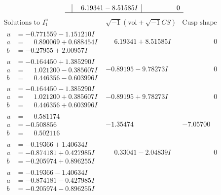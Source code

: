 \documentclass[1p]{elsarticle_modified}
\theoremstyle{definition}
\newcommand{\I}{\sqrt{-1}}
\begin{document}
$$\begin{array}{c|c|c}
 & \phantom{-}6.19341 - 8.51585 I & \phantom{-0.000000 } 0\\
 \hline 
 \end{array}$$\newpage$$\begin{array}{c|c|c}  
\text{Solutions to }I^u_{1}& \I (\text{vol} + \sqrt{-1}CS) & \text{Cusp shape}\\
 \hline 
\begin{aligned}
u &= -0.771559 - 1.151210 I \\
a &= \phantom{-}0.890069 + 0.688454 I \\
b &= -0.27955 + 2.00957 I\end{aligned}
 & \phantom{-}6.19341 + 8.51585 I & \phantom{-0.000000 } 0 \\ \hline\begin{aligned}
u &= -0.164450 + 1.385290 I \\
a &= \phantom{-}1.021200 - 0.385607 I \\
b &= \phantom{-}0.446356 - 0.603996 I\end{aligned}
 & -0.89195 - 9.78273 I & \phantom{-0.000000 } 0 \\ \hline\begin{aligned}
u &= -0.164450 - 1.385290 I \\
a &= \phantom{-}1.021200 + 0.385607 I \\
b &= \phantom{-}0.446356 + 0.603996 I\end{aligned}
 & -0.89195 + 9.78273 I & \phantom{-0.000000 } 0 \\ \hline\begin{aligned}
u &= \phantom{-}0.581174\phantom{ +0.000000I} \\
a &= -0.508856\phantom{ +0.000000I} \\
b &= \phantom{-}0.502116\phantom{ +0.000000I}\end{aligned}
 & -1.35474\phantom{ +0.000000I} & -7.05700\phantom{ +0.000000I} \\ \hline\begin{aligned}
u &= -0.19366 + 1.40634 I \\
a &= -0.874181 + 0.427985 I \\
b &= -0.205974 + 0.896255 I\end{aligned}
 & \phantom{-}0.33041 - 2.04839 I & \phantom{-0.000000 } 0 \\ \hline\begin{aligned}
u &= -0.19366 - 1.40634 I \\
a &= -0.874181 - 0.427985 I \\
b &= -0.205974 - 0.896255 I\end{aligned}

\end{array}$$
\end{document}
